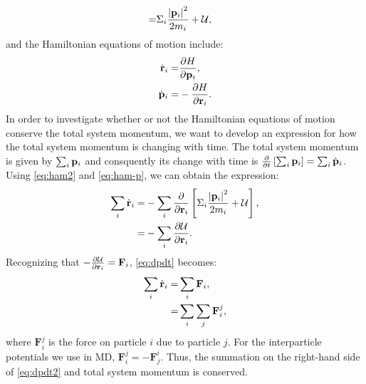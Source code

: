 \documentclass{article}
\begin{document}
\begin{enumerate}[label=\alph*)]
\begin{enumerate}[label=\roman*]
\begin{align}
          = & \Sigma_i \frac{\left|\mathbf{p}_i\right|^2}{2 m_i} + \mathcal{U},
        \end{align}
        and the Hamiltonian equations of motion include:
        \begin{align}
          \dot{\mathbf{r}}_i = & \frac{\partial H}{\partial \mathbf{p}_i}, \\ \label{eq:ham-p}
          \dot{\mathbf{p}}_i = & -\frac{\partial H}{\partial \mathbf{r}_i}.
        \end{align}
        In order to investigate whether or not the Hamiltonian equations of motion conserve the total system momentum, we want to develop an expression for how the total system momentum is changing with time.
        The total system momentum is given by $\sum_i \mathbf{p}_i$ and consquently its change with time is $\frac{\partial}{\partial t} \left[ \sum_i \mathbf{p}_i \right] = \sum_i \dot{\mathbf{p}}_i$.
        Using \eqref{eq:ham2} and \eqref{eq:ham-p}, we can obtain the expression:
        \begin{align}
          \sum_i \dot{\mathbf{r}}_i = & -\sum_i \frac{\partial}{\partial \mathbf{r}_i} \left[ \Sigma_i \frac{\left|\mathbf{p}_i\right|^2}{2 m_i} + \mathcal{U} \right], \\ \label{eq:dpdt}
          = & -\sum_i \frac{\partial \mathcal{U}}{\partial \mathbf{r}_i}.
        \end{align}
        Recognizing that $-\frac{\partial \mathcal{U}}{\partial \mathbf{r}_i} = \mathbf{F}_i$, \eqref{eq:dpdt} becomes:
        \begin{align}
          \sum_i \dot{\mathbf{r}}_i = & \sum_i \mathbf{F}_i, \\ \label{eq:dpdt2}
          = & \sum_i \sum_j \mathbf{F}_i^j,
        \end{align}
        where $\mathbf{F}_i^j$ is the force on particle $i$ due to particle $j$.
        For the interparticle potentials we use in MD, $\mathbf{F}_i^j = -\mathbf{F}_j^i$.
        Thus, the summation on the right-hand side of \eqref{eq:dpdt2} and total system momentum is conserved.


\end{enumerate}
\end{enumerate}
\end{document}
